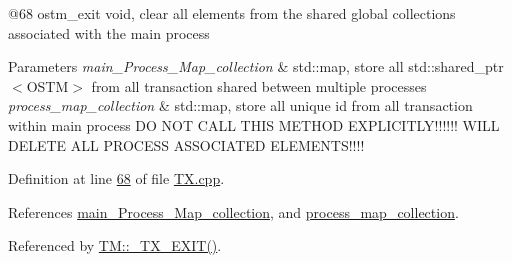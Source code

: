 @68 ostm\+\_\+exit void, clear all elements from the shared global collections associated with the main process 


\begin{DoxyParams}{Parameters}
{\em main\+\_\+\+Process\+\_\+\+Map\+\_\+collection} & std\+::map, store all std\+::shared\+\_\+ptr$<$\+O\+S\+T\+M$>$ from all transaction shared between multiple processes \\
\hline
{\em process\+\_\+map\+\_\+collection} & std\+::map, store all unique id from all transaction within main process DO N\+OT C\+A\+LL T\+H\+IS M\+E\+T\+H\+OD E\+X\+P\+L\+I\+C\+I\+T\+L\+Y!!!!!! W\+I\+LL D\+E\+L\+E\+TE A\+LL P\+R\+O\+C\+E\+SS A\+S\+S\+O\+C\+I\+A\+T\+ED E\+L\+E\+M\+E\+N\+T\+S!!!! \\
\hline
\end{DoxyParams}


Definition at line \hyperlink{_t_x_8cpp_source_l00068}{68} of file \hyperlink{_t_x_8cpp_source}{T\+X.\+cpp}.



References \hyperlink{_t_x_8h_source_l00105}{main\+\_\+\+Process\+\_\+\+Map\+\_\+collection}, and \hyperlink{_t_x_8h_source_l00109}{process\+\_\+map\+\_\+collection}.



Referenced by \hyperlink{_t_m_8cpp_source_l00108}{T\+M\+::\+\_\+\+T\+X\+\_\+\+E\+X\+I\+T()}.


